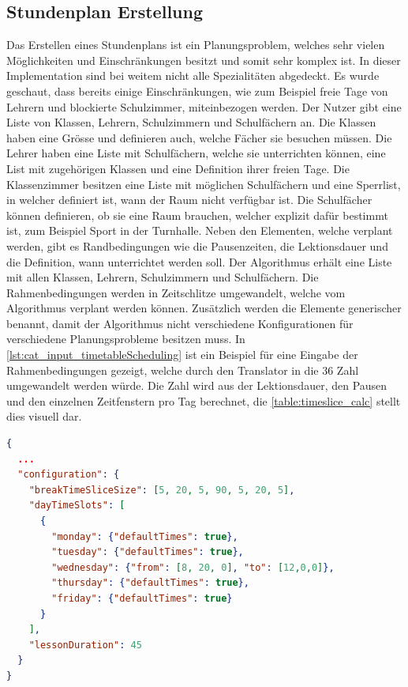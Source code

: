 \subsection{Stundenplan Erstellung}
Das Erstellen eines Stundenplans ist ein Planungsproblem, welches sehr vielen Möglichkeiten und Einschränkungen besitzt und somit sehr komplex ist. In dieser Implementation sind bei weitem 
nicht alle Spezialitäten abgedeckt. Es wurde geschaut, dass bereits einige Einschränkungen, wie zum Beispiel freie Tage von Lehrern und blockierte Schulzimmer, miteinbezogen werden. 
Der Nutzer gibt eine Liste von Klassen, Lehrern, Schulzimmern und Schulfächern an. Die Klassen haben eine Grösse und definieren auch, welche Fächer sie besuchen müssen. Die Lehrer haben 
eine Liste mit Schulfächern, welche sie unterrichten können, eine List mit zugehörigen Klassen und eine Definition ihrer freien Tage. Die Klassenzimmer besitzen eine Liste mit möglichen 
Schulfächern und eine Sperrlist, in welcher definiert ist, wann der Raum nicht verfügbar ist. Die Schulfächer können definieren, ob sie eine Raum brauchen, welcher explizit dafür 
bestimmt ist, zum Beispiel Sport in der Turnhalle. Neben den Elementen, welche verplant werden, gibt es Randbedingungen wie die Pausenzeiten, die Lektionsdauer und die Definition, 
wann unterrichtet werden soll. Der Algorithmus erhält eine Liste mit allen Klassen, Lehrern, Schulzimmern und Schulfächern. Die Rahmenbedingungen werden in Zeitschlitze umgewandelt, 
welche vom Algorithmus verplant werden können. Zusätzlich werden die Elemente generischer benannt, damit der Algorithmus nicht verschiedene Konfigurationen für verschiedene 
Planungsprobleme besitzen muss. In \autoref{lst:cat_input_timetableScheduling} ist ein Beispiel für eine Eingabe der Rahmenbedingungen gezeigt, welche durch den Translator in die 36 Zahl 
umgewandelt werden würde. Die Zahl wird aus der Lektionsdauer, den Pausen und den einzelnen Zeitfenstern pro Tag berechnet, die \autoref{table:timeslice_calc} stellt dies visuell dar.

\begin{lstlisting}[language=JSON, caption=Ausschnitt einer Eingabe für das Stundenplanproblem für die Rahmenbedingungen, label=lst:cat_input_timetableScheduling]  
{
  ...
  "configuration": {
    "breakTimeSliceSize": [5, 20, 5, 90, 5, 20, 5],
    "dayTimeSlots": [
      {
        "monday": {"defaultTimes": true},
        "tuesday": {"defaultTimes": true},
        "wednesday": {"from": [8, 20, 0], "to": [12,0,0]},
        "thursday": {"defaultTimes": true},
        "friday": {"defaultTimes": true}
      }
    ],
    "lessonDuration": 45
  }
}
\end{lstlisting}

